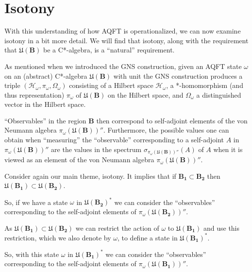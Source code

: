 \section{Isotony}\label{sctn:isotony}
With this understanding of how AQFT is operationalized, we can now examine isotony in a bit more detail. We will find that isotony, along with the requirement that $\mathfrak{U}(\mathbf{B})$ be a C*-algebra, is a ``natural'' requirement.

As mentioned when we introduced the GNS construction, given an AQFT state $\omega$ on an (abstract) C*-algebra $\mathfrak{U}(\mathbf{B})$ with unit the GNS construction produces a triple $(\mathcal{H}_\omega, \pi_\omega, \Omega_\omega)$ consisting of a Hilbert space $\mathcal{H}_\omega$, a *-homomorphism (and thus representation) $\pi_\omega$ of $\mathfrak{U}(\mathbf{B})$ on the Hilbert space, and $\Omega_\omega$ a distinguished vector in the Hilbert space.

``Observables'' in the region $\mathbf{B}$ then correspond to self-adjoint elements of the von Neumann algebra $\pi_\omega(\mathfrak{U}(\mathbf{B}))''$. Furthermore, the possible values one can obtain when ``measuring'' the ``observable'' corresponding to a self-adjoint $A$ in $\pi_\omega(\mathfrak{U}(\mathbf{B}))''$ are the values in the spectrum $\sigma_{\pi_\omega(\mathfrak{U}(\mathbf{B}))''}(A)$ of $A$ when it is viewed as an element of the von Neumann algebra $\pi_\omega(\mathfrak{U}(\mathbf{B}))''$.

Consider again our main theme, isotony. It implies that if $\mathbf{B_1} \subset \mathbf{B_2}$ then $\mathfrak{U}(\mathbf{B_1}) \subset \mathfrak{U}(\mathbf{B_2})$.

So, if we have a state $\omega$ in $\mathfrak{U}(\mathbf{B_2})^*$ we can consider the ``observables'' corresponding to the self-adjoint elements of $\pi_{\omega}(\mathfrak{U}(\mathbf{B_2}))''$.

As $\mathfrak{U}(\mathbf{B_1}) \subset \mathfrak{U}(\mathbf{B_2})$ we can restrict the action of $\omega$ to $\mathfrak{U}(\mathbf{B_1})$ and use this restriction, which we also denote by $\omega$, to define a state in $\mathfrak{U}(\mathbf{B_1})^*$.

So, with this state $\omega$ in $\mathfrak{U}(\mathbf{B_1})^*$ we can consider the ``observables'' corresponding to the self-adjoint elements of $\pi_{\omega}(\mathfrak{U}(\mathbf{B_1}))''$.

